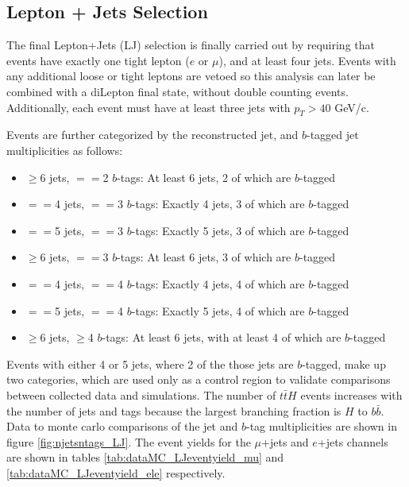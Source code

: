 \subsection{Lepton + Jets Selection}
\label{LJ_selection_overview}

\par The final Lepton+Jets (LJ) selection is finally carried out by
requiring that events have exactly one tight lepton ($e$ or
$\mu$), and at least four jets. Events with any additional loose or
tight leptons are vetoed so this analysis can later be combined with a
diLepton final state, without double counting events. Additionally,
each event must have at least three jets with $p_{T} > 40$ GeV/c.

\par Events are further categorized by the reconstructed jet, and
$b$-tagged jet multiplicities as follows:

\begin{itemize}
  \item $\ge$6 jets,  $==$2 $b$-tags: At least 6 jets, 2 of which are $b$-tagged 
  \item $==$4 jets, $==$3 $b$-tags: Exactly 4 jets, 3 of which are $b$-tagged 
  \item $==$5 jets, $==$3 $b$-tags: Exactly 5 jets, 3 of which are $b$-tagged 
  \item $\ge$6 jets, $==$3 $b$-tags: At least 6 jets, 3 of which are $b$-tagged 
  \item $==$4 jets, $==$4 $b$-tags: Exactly 4 jets, 4 of which are $b$-tagged 
  \item $==$5 jets, $==$4 $b$-tags: Exactly 5 jets, 4 of which are $b$-tagged 
  \item $\ge$6 jets, $\ge$4 $b$-tags: At least 6 jets, with at least 4 of which are $b$-tagged 
\end{itemize}

\noindent Events with either 4 or 5 jets, where 2 of the those jets
are $b$-tagged, make up two categories, which are used only as a
control region to validate comparisons between collected data and
simulations.  The number of $t\bar{t}H$ events increases with the
number of jets and tags because the largest branching fraction is $H$
to $b\bar{b}$.  Data to monte carlo comparisons of the jet and $b$-tag
multiplicities are shown in figure \ref{fig:njetsntags_LJ}.  The event
yields for the $\mu$+jets and $e$+jets channels are shown in tables
\ref{tab:dataMC_LJeventyield_mu} and \ref{tab:dataMC_LJeventyield_ele}
respectively. 

